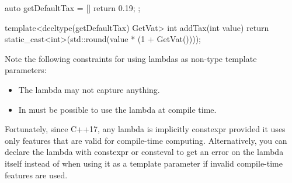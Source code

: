\begin{cpp}
auto getDefaultTax = [] {
	return 0.19;
};

template<decltype(getDefaultTax) GetVat>
int addTax(int value)
{
	return static_cast<int>(std::round(value * (1 + GetVat())));
}
\end{cpp}

Note the following constraints for using lambdas as non-type template parameters:

\begin{itemize}
\item 
The lambda may not capture anything.

\item
In must be possible to use the lambda at compile time.
\end{itemize}

Fortunately, since C++17, any lambda is implicitly constexpr provided it uses only features that are valid for compile-time computing. Alternatively, you can declare the lambda with constexpr or consteval to get an error on the lambda itself instead of when using it as a template parameter if invalid compile-time features are used.









